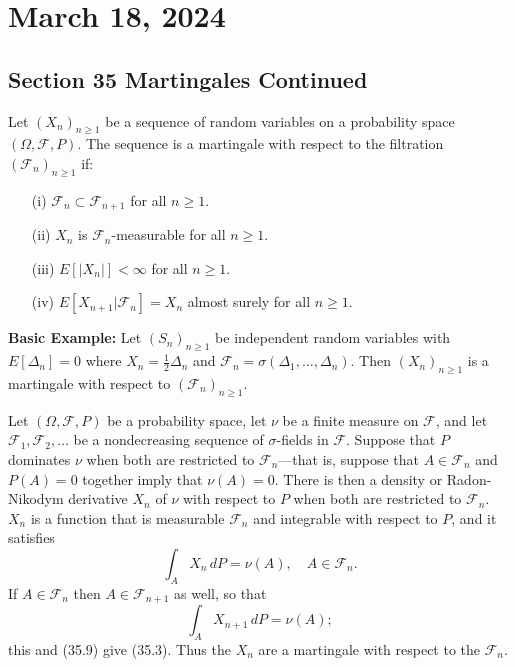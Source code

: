 \newpage
\section{March 18, 2024}
\subsection{Section 35 Martingales Continued}

\begin{definition}
Let $(X_n)_{n \geq 1}$ be a sequence of random variables on a probability space $(\Omega, \mathcal{F}, P)$. The sequence is a martingale with respect to the filtration $(\mathcal{F}_n)_{n\geq 1}$ if:
\begin{itemize}
    \item[(i)] $\mathcal{F}_n \subset \mathcal{F}_{n+1}$ for all $n \geq 1$.
    \item[(ii)] $X_n$ is $\mathcal{F}_n$-measurable for all $n \geq 1$.
    \item[(iii)] $E[|X_n|] < \infty$ for all $n \geq 1$.
    \item[(iv)] $E[X_{n+1} | \mathcal{F}_n] = X_n$ almost surely for all $n \geq 1$.
\end{itemize}
\end{definition}

\textbf{Basic Example:} Let $(S_n)_{n\geq 1}$ be independent random variables with $E[\Delta_n] = 0$ where $X_n = \frac{1}{2} \Delta_n$ and $\mathcal{F}_n = \sigma(\Delta_1, \ldots, \Delta_n)$. Then $(X_n)_{n\geq 1}$ is a martingale with respect to $(\mathcal{F}_n)_{n\geq 1}$.
\begin{example}
Let \((\Omega, \mathcal{F}, P)\) be a probability space, let \(\nu\) be a finite measure on \(\mathcal{F}\), and let \(\mathcal{F}_1, \mathcal{F}_2, \ldots\) be a nondecreasing sequence of \(\sigma\)-fields in \(\mathcal{F}\). Suppose that \(P\) dominates \(\nu\) when both are restricted to \(\mathcal{F}_n\)---that is, suppose that \(A \in \mathcal{F}_n\) and \(P(A) = 0\) together imply that \(\nu(A) = 0\). There is then a density or Radon-Nikodym derivative \(X_n\) of \(\nu\) with respect to \(P\) when both are restricted to \(\mathcal{F}_n\). \(X_n\) is a function that is measurable \(\mathcal{F}_n\) and integrable with respect to \(P\), and it satisfies
\begin{equation}
    \int_A X_n \, dP = \nu(A), \quad A \in \mathcal{F}_n.
\end{equation}
If \(A \in \mathcal{F}_n\) then \(A \in \mathcal{F}_{n+1}\) as well, so that
\begin{equation}
    \int_A X_{n+1} \, dP = \nu(A);
\end{equation}
this and (35.9) give (35.3). Thus the \(X_n\) are a martingale with respect to the \(\mathcal{F}_n\).
\end{example}

